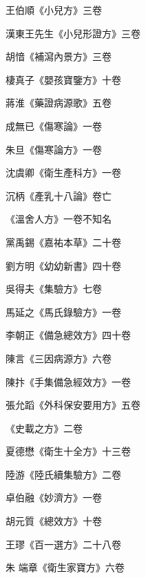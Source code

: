 \begin{pinyinscope}
 王伯順《小兒方》三卷



 漢東王先生《小兒形證方》三卷



 胡愔《補瀉內景方》三卷



 棲真子《嬰孩寶鑒方》十卷



 蔣淮《藥證病源歌》五卷



 成無已《傷寒論》一卷



 朱旦《傷寒論方》一卷



 沈虞卿《衛生產科方》一卷



 沉柄《產乳十八論》卷亡



 《溫舍人方》一卷不知名



 黨禹錫《嘉祐本草》二十卷



 劉方明《幼幼新書》四十卷



 吳得夫《集驗方》七卷



 馬延之《馬氏錄驗方》一卷



 李朝正《備急總效方》四十卷



 陳言《三因病源方》六卷



 陳抃《手集備急經效方》一卷



 張允蹈《外科保安要用方》五卷



 《史載之方》二卷



 夏德懋《衛生十全方》十三卷



 陸游《陸氏續集驗方》二卷



 卓伯融《妙濟方》一卷



 胡元質《總效方》十卷



 王璆《百一選方》二十八卷



 朱
 端章《衛生家寶方》六卷




\end{pinyinscope}
